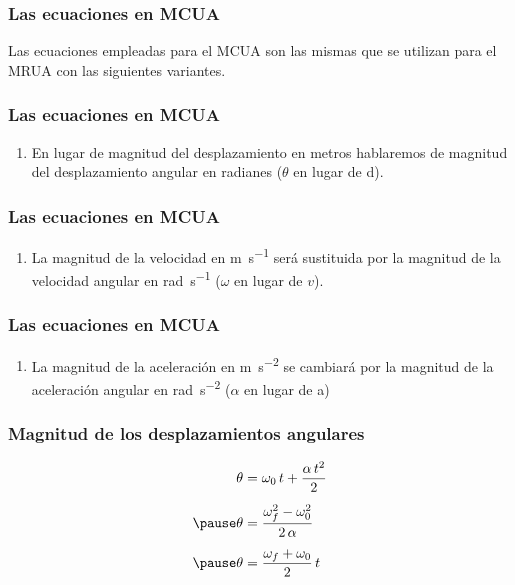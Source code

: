 \documentclass[14pt]{beamer}
\begin{document}
\begin{frame}
\frametitle{Las ecuaciones en MCUA}
Las ecuaciones empleadas para el MCUA son las mismas que se utilizan para el MRUA con las siguientes
variantes.
\end{frame}
\begin{frame}
\frametitle{Las ecuaciones en MCUA}
\begin{enumerate}[<+->]
\item En lugar de magnitud del desplazamiento en metros hablaremos de magnitud del desplazamiento angular en radianes ($\theta$ en lugar de d).
\seti
\end{enumerate}
\end{frame}
\begin{frame}
\frametitle{Las ecuaciones en MCUA}
\begin{enumerate}[<+->]
\conti
\item La magnitud de la velocidad en \unit{\meter\per\second} será sustituida por la magnitud de la velocidad angular en \unit{\radian\per\second} ($\omega$ en lugar de $v$).
\seti
\end{enumerate}
\end{frame}
\begin{frame}
\frametitle{Las ecuaciones en MCUA}
\begin{enumerate}[<+->]
\conti
\item La magnitud de la aceleración en \unit{\meter\per\square\second} se cambiará por la magnitud de la aceleración angular en \unit{\radian\per\square\second} ($\alpha$ en lugar de a)
\end{enumerate}
\end{frame}
\begin{frame}
\frametitle{Magnitud de los desplazamientos angulares}
\vspace*{-1cm}
\begin{eqnarray*}
\begin{aligned}
\theta &= \omega_{0} \, t + \dfrac{\alpha \, t^{2}}{2} \\[0.5em] \pause
\theta &= \dfrac{\omega_{f}^{2} - \omega_{0}^{2}}{2 \, \alpha} \\[0.5em] \pause
\theta &= \dfrac{\omega_{f} + \omega_{0}}{2} \, t
\end{aligned}
\end{eqnarray*}
\end{frame}
\end{document}
